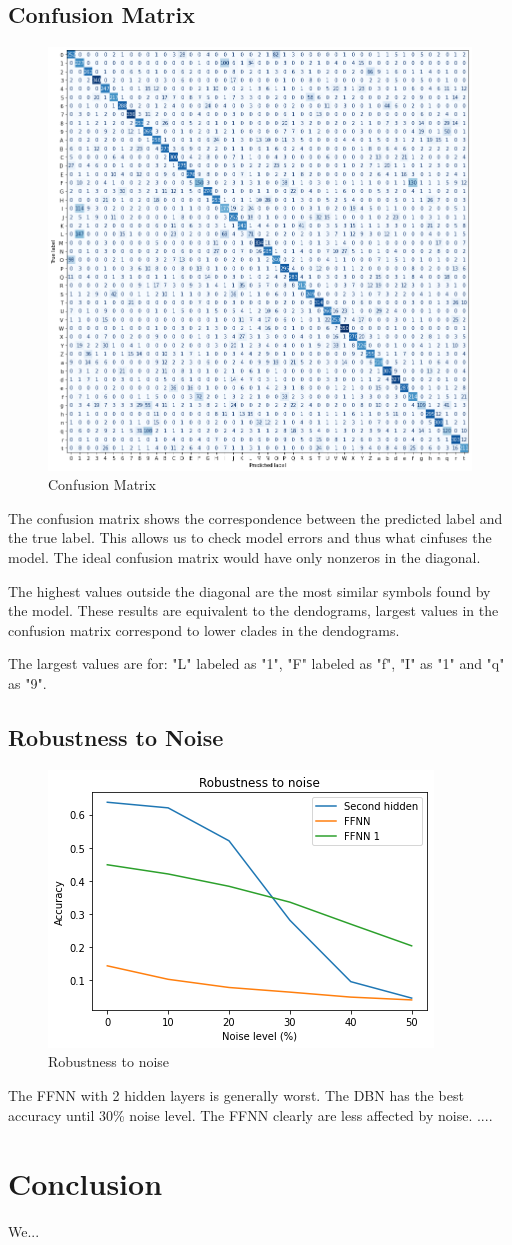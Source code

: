 \documentclass[a4paper, 11pt]{article}
\begin{document}
		\subsection{Confusion Matrix}	
			\begin{figure}[H]
				\centering
				\includegraphics[width=.6\linewidth]{confmatBlue2.png} %
				\caption{Confusion Matrix}
				\label{fig:confmat}
			\end{figure}
		
			The confusion matrix shows the correspondence between the predicted label and the true label.
			This allows us to check model errors and thus what cinfuses the model.
			The ideal confusion matrix would have only nonzeros in the diagonal.
			
			The highest values outside the diagonal are the most similar symbols found by the model.
			These results are equivalent to the dendograms, largest values in the confusion matrix correspond to lower clades in the dendograms.
			
			The largest values are for: "L" labeled as "1", "F" labeled as "f", "I" as "1" and "q" as "9".
			 
			
		\subsection{Robustness to Noise}	
			\begin{figure}[H]
				\centering
				\includegraphics[width=.5\linewidth]{noise2.png} %
				\caption{Robustness to noise}
				\label{fig:robNoise}
			\end{figure}
		
			The FFNN with 2 hidden layers is generally worst.
			The DBN has the best accuracy until 30\% noise level.
			The FFNN clearly are less affected by noise.
			....
		
	\section{Conclusion}
		We...
	
		
		
	\printbibliography
			
\end{document}

